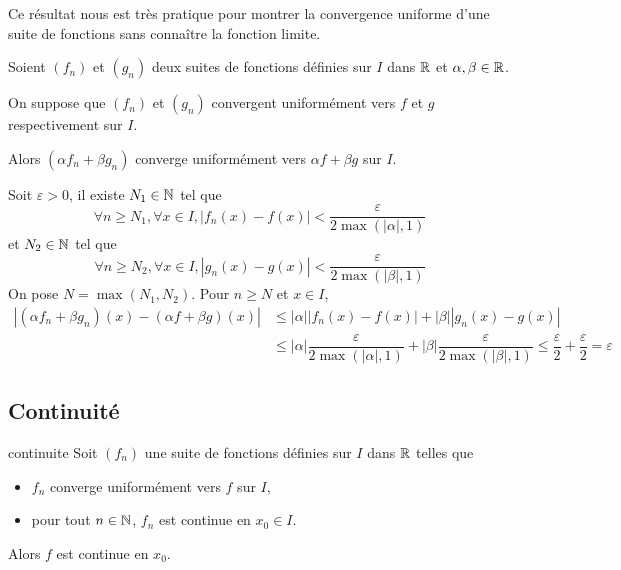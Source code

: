 \documentclass[a4paper,12pt]{article}
\begin{document}
\begin{remarque}
    Ce résultat nous est très pratique pour montrer la convergence uniforme d'une suite de fonctions sans connaître la fonction limite.
\end{remarque}

\clearpage

\begin{proposition}{}{}
    Soient $(f_n)$ et $(g_n)$ deux suites de fonctions définies sur $I$ dans $\mathbb{R}$ et $\alpha, \beta \in \mathbb{R}$.
    
    \vspace{0.4cm}
    On suppose que $(f_n)$ et $(g_n)$ convergent uniformément vers $f$ et $g$ respectivement sur $I$.

    Alors $(\alpha f_n + \beta g_n)$ converge uniformément vers $\alpha f + \beta g$ sur $I$.
\end{proposition}

\begin{demonstration}
    Soit $\varepsilon > 0$, il existe $N_1 \in \mathbb{N}$ tel que
    $$
    \forall n \geq N_1, \forall x \in I, |f_n(x) - f(x)| < \dfrac{\varepsilon}{2 \max(|\alpha|, 1)}
    $$
    et $N_2 \in \mathbb{N}$ tel que
    $$
    \forall n \geq N_2, \forall x \in I, |g_n(x) - g(x)| < \dfrac{\varepsilon}{2 \max(|\beta|, 1)}
    $$
    On pose $N = \max(N_1, N_2)$.
    Pour $n \geq N$ et $x \in I$,
    \begin{align*}
        |(\alpha f_n + \beta g_n)(x) - (\alpha f + \beta g)(x)| &\leq |\alpha| |f_n(x) - f(x)| + |\beta| |g_n(x) - g(x)| \\
        &\leq |\alpha| \dfrac{\varepsilon}{2 \max(|\alpha|, 1)} + |\beta| \dfrac{\varepsilon}{2 \max(|\beta|, 1)} \leq \dfrac{\varepsilon}{2} + \dfrac{\varepsilon}{2} = \varepsilon
    \end{align*}
\end{demonstration}

\subsection{Continuité}

\begin{theoreme}{}{continuite}
    Soit $(f_n)$ une suite de fonctions définies sur $I$ dans $\mathbb{R}$ telles que

    \begin{itemize}[label=--]
        \item $f_n$ converge uniformément vers $f$ sur $I$,
        \item pour tout $n \in \mathbb{N}$, $f_n$ est continue en $x_0 \in I$.
    \end{itemize}
    Alors $f$ est continue en $x_0$.
\end{theoreme}
\end{document}
